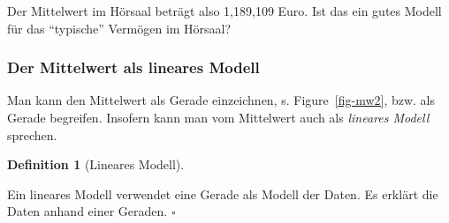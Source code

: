 \documentclass[
  letterpaper,
  DIV=11,
  numbers=noendperiod]{scrartcl}
\theoremstyle{definition}
\theoremstyle{definition}
\theoremstyle{definition}
\newtheorem{definition}{Definition}[section]
\theoremstyle{remark}
\begin{document}
Der Mittelwert im Hörsaal beträgt also 1,189,109 Euro. Ist das ein gutes
Modell für das ``typische'' Vermögen im Hörsaal?

\subsubsection{Der Mittelwert als lineares
Modell}\label{der-mittelwert-als-lineares-modell}

Man kann den Mittelwert als Gerade einzeichnen, s. Figure~\ref{fig-mw2},
bzw. als Gerade begreifen. Insofern kann man vom Mittelwert auch als
\emph{lineares Modell} sprechen.

\begin{definition}[Lineares
Modell]\protect\hypertarget{def-lm}{}\label{def-lm}

Ein lineares Modell verwendet eine Gerade als Modell der Daten. Es
erklärt die Daten anhand einer Geraden. \(\square\)

\end{definition}
\end{document}
